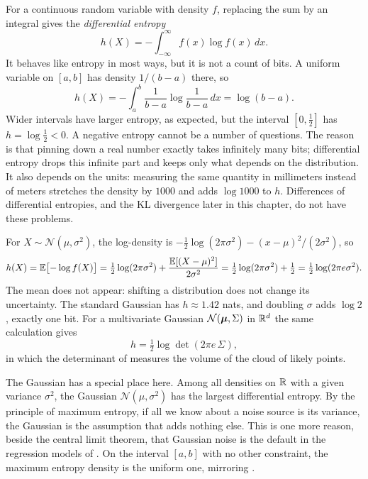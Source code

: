 For a continuous random variable with density $f$, replacing the sum by
an integral gives the \emph{differential entropy}
\[
  h(X) = -\int_{-\infty}^{\infty} f(x) \log f(x)\, dx .
\]
It behaves like entropy in most ways, but it is not a count of bits. A
uniform variable on $[a, b]$ has density $1/(b - a)$ there, so
\[
  h(X) = -\int_a^b \frac{1}{b - a} \log \frac{1}{b - a}\, dx = \log(b - a) .
\]
Wider intervals have larger entropy, as expected, but the interval
$[0, \tfrac12]$ has $h = \log \tfrac12 < 0$. A negative entropy cannot be
a number of questions. The reason is that pinning down a real number
exactly takes infinitely many bits; differential entropy drops this
infinite part and keeps only what depends on the distribution. It also
depends on the units: measuring the same quantity in millimeters
instead of meters stretches the density by $1000$ and adds $\log 1000$ to
$h$. Differences of differential entropies, and the KL divergence later
in this chapter, do not have these problems.

\begin{example}[Gaussian]
  \label{ex:ch07-gaussian-entropy}
  For $X \sim \mathcal{N}(\mu, \sigma^2)$, the log-density is
  $-\tfrac12 \log(2\pi\sigma^2) - (x - \mu)^2/(2\sigma^2)$, so
  \[
    h(X) = \mathbb{E}\bigl[-\log f(X)\bigr]
    = \tfrac12 \log(2\pi\sigma^2) + \frac{\mathbb{E}[(X - \mu)^2]}{2\sigma^2}
    = \tfrac12 \log(2\pi\sigma^2) + \tfrac12
    = \tfrac12 \log(2\pi e \sigma^2) .
  \]
  The mean does not appear: shifting a distribution does not change its
  uncertainty. The standard Gaussian has $h \approx 1.42$ nats, and
  doubling $\sigma$ adds $\log 2$, exactly one bit. For a multivariate
  Gaussian $\mathcal{N}(\bm{\mu}, \Sigma)$ in $\mathbb{R}^d$ the same calculation
  gives
  \[
    h = \tfrac12 \log \det(2\pi e\, \Sigma) ,
  \]
  in which the determinant of  measures the volume
  of the cloud of likely points.
\end{example}

The Gaussian has a special place here. Among all densities on $\mathbb{R}$ with a
given variance $\sigma^2$, the Gaussian $\mathcal{N}(\mu, \sigma^2)$ has
the largest differential entropy. By the principle of maximum entropy,
if all we know about a noise source is its variance, the Gaussian is the
assumption that adds nothing else. This is one more reason, beside the
central limit theorem, that Gaussian noise is the default in the
regression models of . On the interval $[a, b]$
with no other constraint, the maximum entropy density is the uniform
one, mirroring .

